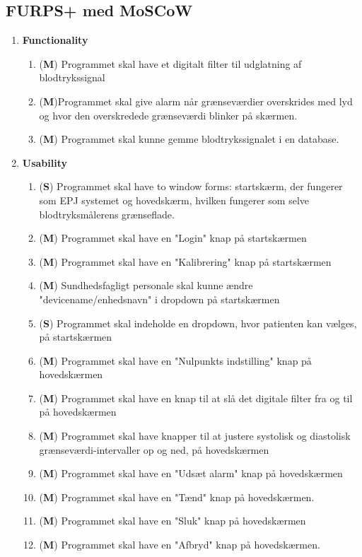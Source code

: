 \subsection{FURPS+ med MoSCoW}
\begin{enumerate}
\item \textbf{Functionality}
\begin{enumerate}
\item (\textbf{M}) Programmet skal have et digitalt filter til udglatning af blodtrykssignal
\item (\textbf{M})Programmet skal give alarm når grænseværdier overskrides med lyd og hvor den overskredede grænseværdi blinker på skærmen.
\item (\textbf{M}) Programmet skal kunne gemme blodtrykssignalet i en database.
\end{enumerate}
\item \textbf{Usability}
\begin{enumerate}
\item (\textbf{S}) Programmet skal have to window forms: startskærm, der fungerer som  EPJ systemet og hovedskærm, hvilken fungerer som selve blodtryksmålerens grænseflade.
\item (\textbf{M}) Programmet skal have en "Login" knap på startskærmen
\item (\textbf{M}) Programmet skal have en "Kalibrering" knap på startskærmen
\item (\textbf{M}) Sundhedsfagligt personale skal kunne ændre "devicename/enhedsnavn" i dropdown på startskærmen
\item (\textbf{S}) Programmet skal indeholde en dropdown, hvor patienten kan vælges, på startskærmen
\item (\textbf{M}) Programmet skal have en "Nulpunkts indstilling" knap på hovedskærmen
\item (\textbf{M}) Programmet skal have en knap til at slå det digitale filter fra og til på hovedskærmen
\item (\textbf{M}) Programmet skal have knapper til at justere systolisk og diastolisk grænseværdi-intervaller op og ned, på hovedskærmen
\item (\textbf{M}) Programmet skal have en "Udsæt alarm" knap på hovedskærmen
\item (\textbf{M}) Programmet skal have en "Tænd" knap på hovedskærmen.
\item (\textbf{M}) Programmet skal have en "Sluk" knap på hovedskærmen
\item (\textbf{M}) Programmet skal have en "Afbryd" knap på hovedskærmen.

\end{enumerate}
\end{enumerate}
